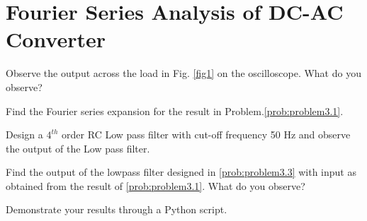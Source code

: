 \documentclass[journal,12pt,twocolumn]{IEEEtran}
\begin{document}
\section{Fourier Series Analysis of DC-AC Converter}
\begin{problem}
Observe the output across the load in Fig. \ref{fig1} on the oscilloscope. What do you observe? \label{prob:problem3.1}
\end{problem}
\begin{problem}
Find the Fourier series expansion for the result in Problem.\ref{prob:problem3.1}.
\end{problem}
\begin{problem}
Design a $4^{th}$ order RC Low pass filter with cut-off frequency 50 Hz and observe the output of the Low pass filter.\label{prob:problem3.3}
\end{problem} 
\begin{problem}
Find the output of the lowpass filter designed in \ref{prob:problem3.3} with input as obtained from the result of \ref{prob:problem3.1}. What do you observe? \label{prob:problem3.4}
\end{problem}
\begin{problem}
Demonstrate your results through a Python script.
\end{problem}
\end{document}
